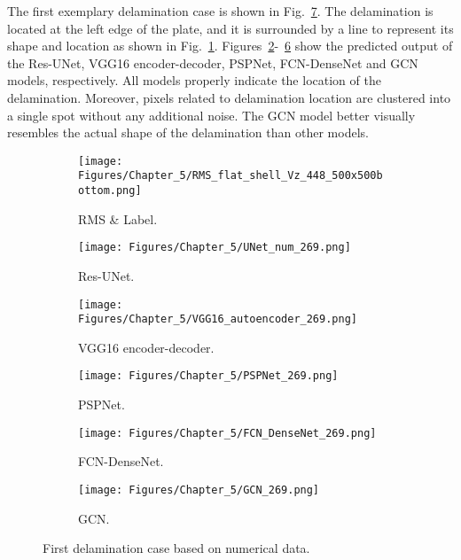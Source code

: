 The first exemplary delamination case is shown in Fig.~\ref{fig:rms_first_case}. 
The delamination is located at the left edge of the plate, and it is surrounded by a line to represent its shape and location as shown in Fig.~\ref{fig:RMS_bottom_448}.
Figures~\ref{fig:unet_269}-~\ref{fig:gcn_269} show the predicted output of the Res-UNet, VGG16 encoder-decoder, PSPNet, FCN-DenseNet and GCN models, respectively. 
All models properly indicate the location of the delamination. 
Moreover, pixels related to delamination location are clustered into a single spot without any additional noise. 
The GCN model better visually resembles the actual shape of the delamination than other models.
\begin{figure} [!h]
	\centering
	\begin{subfigure}[b]{.48\textwidth}
		\centering
		\texttt{[image: Figures/Chapter\_5/RMS\_flat\_shell\_Vz\_448\_500x500bottom.png]}
		\caption{RMS \& Label.}
		\label{fig:RMS_bottom_448}
	\end{subfigure}
	\hfill
	\begin{subfigure}[b]{.48\textwidth}
		\centering
		\texttt{[image: Figures/Chapter\_5/UNet\_num\_269.png]}
		\caption{Res-UNet.}
		\label{fig:unet_269}	
	\end{subfigure}
	\hfill
	\begin{subfigure}[b]{.48\textwidth}
		\centering
		\texttt{[image: Figures/Chapter\_5/VGG16\_autoencoder\_269.png]}
		\caption{VGG16 encoder-decoder.}
		\label{fig:vgg16_269}
	\end{subfigure}
	\hfill
	\begin{subfigure}[b]{.48\textwidth}
		\centering
		\texttt{[image: Figures/Chapter\_5/PSPNet\_269.png]}
		\caption{PSPNet.}
		\label{fig:pspnet_269}	
	\end{subfigure}
	\hfill
	\begin{subfigure}[b]{.48\textwidth}
		\centering
		\texttt{[image: Figures/Chapter\_5/FCN\_DenseNet\_269.png]}
		\caption{FCN-DenseNet.}
		\label{fig:densenet_269}
	\end{subfigure}
	\hfill
	\begin{subfigure}[b]{.48\textwidth}
		\centering
		\texttt{[image: Figures/Chapter\_5/GCN\_269.png]}
		\caption{GCN.}
		\label{fig:gcn_269}	
	\end{subfigure}
	\caption{First delamination case based on numerical data.}
	\label{fig:rms_first_case}
\end{figure}

